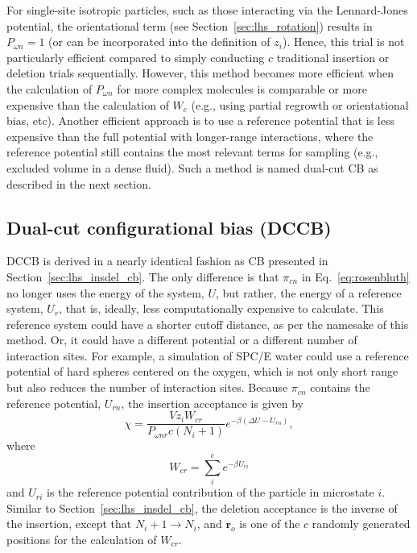 For single-site isotropic particles, such as those interacting via the Lennard-Jones potential, the orientational term (see Section~\ref{sec:lhs_rotation}) results in $P_{\omega n} = 1$ (or can be incorporated into the definition of $z_i$).
Hence, this trial is not particularly efficient compared to simply conducting $c$ traditional insertion or deletion trials sequentially.
However, this method becomes more efficient when the calculation of $P_{\omega n}$ for more complex molecules is comparable or more expensive than the calculation of $W_{c}$ (e.g., using partial regrowth or orientational bias, etc).
Another efficient approach is to use a reference potential that is less expensive than the full potential with longer-range interactions, where the reference potential still contains the most relevant terms for sampling (e.g., excluded volume in a dense fluid).
Such a method is named dual-cut CB \cite{vlugt_improving_1998} as described in the next section.

\subsection{\label{sec:lhs_insdel_dccb}Dual-cut configurational bias (DCCB)}

DCCB \cite{vlugt_improving_1998} is derived in a nearly identical fashion as CB presented in Section~\ref{sec:lhs_insdel_cb}.
The only difference is that $\pi_{cn}$ in Eq.~\ref{eq:rosenbluth} no longer uses the energy of the system, $U$, but rather, the energy of a reference system, $U_{r}$, that is, ideally, less computationally expensive to calculate.
This reference system could have a shorter cutoff distance, as per the namesake of this method.
Or, it could have a different potential or a different number of interaction sites.
For example, a simulation of SPC/E water could use a reference potential of hard spheres centered on the oxygen, which is not only short range but also reduces the number of interaction sites.
Because $\pi_{cn}$ contains the reference potential, $U_{rn}$, the insertion acceptance is given by
\begin{equation}
\chi = \frac{Vz_i W_{{c}r}}{P_{\omega nr}{c}(N_i+1)}e^{-\beta(\Delta U - U_{rn})},
\label{eq:lhs_ins_dccb}
\end{equation}
where
\begin{equation}
W_{{c}r}=\sum_{i}^{c} e^{-\beta U_{ri}}
\label{eq:wcr}
\end{equation}
and $U_{ri}$ is the reference potential contribution of the particle in microstate $i$.
Similar to Section~\ref{sec:lhs_insdel_cb}, the deletion acceptance is the inverse of the insertion, except that $N_i+1 \rightarrow N_i$, and $\mathbf{r}_o$ is one of the $c$ randomly generated positions for the calculation of $W_{{c}r}$.

